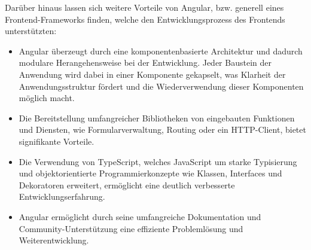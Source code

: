 \documentclass[../main.tex]{subfiles}
\begin{document}
Darüber hinaus lassen sich weitere Vorteile von Angular, bzw. generell eines Frontend-Frameworks finden, welche den Entwicklungsprozess
des Frontends unterstützten:

\begin{itemize}

  \item 
  Angular überzeugt durch eine komponentenbasierte Architektur und dadurch modulare Herangehensweise bei der Entwicklung.
  Jeder Baustein der Anwendung wird dabei in einer Komponente gekapselt, was Klarheit der Anwendungsstruktur fördert und die Wiederverwendung
  dieser Komponenten möglich macht.

  \item 
  Die Bereitstellung umfangreicher Bibliotheken von eingebauten Funktionen und Diensten, wie Formularverwaltung, Routing oder ein HTTP-Client, 
  bietet signifikante Vorteile.

  \item 
  Die Verwendung von TypeScript, welches JavaScript um starke Typisierung und objektorientierte Programmierkonzepte wie Klassen, Interfaces und 
  Dekoratoren erweitert, ermöglicht eine deutlich verbesserte Entwicklungserfahrung.
  
  \item 
  Angular ermöglicht durch seine umfangreiche Dokumentation und Community-Unterstützung eine effiziente Problemlösung und Weiterentwicklung.
  
\end{itemize}
\end{document}
